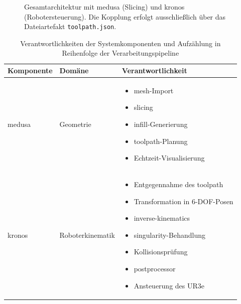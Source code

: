             \begin{figure}[ht]
                \centering
                \resizebox{\linewidth}{!}{
                        
                    }
                \caption[Gesamtarchitektur des Systems]{%
                    Gesamtarchitektur mit \ac{medusa} (Slicing) und \ac{kronos} (Robotersteuerung).
                    Die Kopplung erfolgt ausschließlich über das Dateiartefakt \texttt{toolpath.json}.
                }
                \label{fig:concept-system-architecture}
            \end{figure}

            \begin{table}[ht]
                \centering
                \caption[Verantwortlichkeiten der Systemkomponenten]
                        {Verantwortlichkeiten der Systemkomponenten und Aufzählung in Reihenfolge der Verarbeitungspipeline}
                \label{tab:concept-component-responsibilities}
                \begin{tabular}{@{} l l p{8.0cm} @{}}
                    \toprule
                    \textbf{Komponente} & \textbf{Domäne} & \textbf{Verantwortlichkeit} \\
                    \midrule
                    \ac{medusa} & Geometrie &
                        \begin{itemize}[leftmargin=*, nosep, label=--]
                            \item \gls{mesh}-Import
                            \item \gls{slicing}
                            \item \gls{infill}-Generierung
                            \item \gls{toolpath}-Planung
                            \item Echtzeit-Visualisierung
                        \end{itemize} \\
                    \addlinespace
                    \ac{kronos} & Roboterkinematik &
                        \begin{itemize}[leftmargin=*, nosep, label=--]
                            \item Entgegennahme des \gls{toolpath}
                            \item Transformation in 6-\ac{DOF}-Posen
                            \item \gls{inverse-kinematics}
                            \item \gls{singularity}-Behandlung
                            \item Kollisionsprüfung
                            \item \gls{postprocessor}
                            \item Ansteuerung des UR3e
                        \end{itemize} \\
                    \bottomrule
                \end{tabular}
            \end{table}

